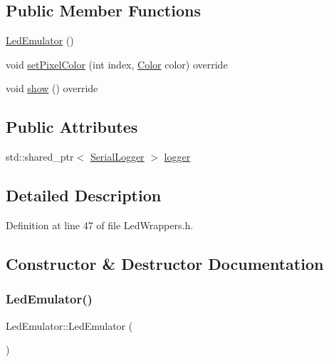 \subsection*{Public Member Functions}
\begin{DoxyCompactItemize}
\item 
\hyperlink{class_led_emulator_a841f458b75e4d23f17fe26c98f1729c5}{Led\+Emulator} ()
\item 
void \hyperlink{class_led_emulator_a13ce7b61ea614d4d48f3a87c582b6148}{set\+Pixel\+Color} (int index, \hyperlink{struct_color}{Color} color) override
\item 
void \hyperlink{class_led_emulator_ad9a0629926516da0368b03d530a91815}{show} () override
\end{DoxyCompactItemize}
\subsection*{Public Attributes}
\begin{DoxyCompactItemize}
\item 
std\+::shared\+\_\+ptr$<$ \hyperlink{class_serial_logger}{Serial\+Logger} $>$ \hyperlink{class_led_emulator_adfd43bb9a851945ec10daed16907b36c}{logger}
\end{DoxyCompactItemize}


\subsection{Detailed Description}


Definition at line 47 of file Led\+Wrappers.\+h.



\subsection{Constructor \& Destructor Documentation}
\mbox{\label{class_led_emulator_a841f458b75e4d23f17fe26c98f1729c5}} 
\subsubsection{\texorpdfstring{Led\+Emulator()}{LedEmulator()}}
{\footnotesize\ttfamily Led\+Emulator\+::\+Led\+Emulator (\begin{DoxyParamCaption}{ }\end{DoxyParamCaption})\hspace{0.3cm}{\ttfamily [inline]}}



